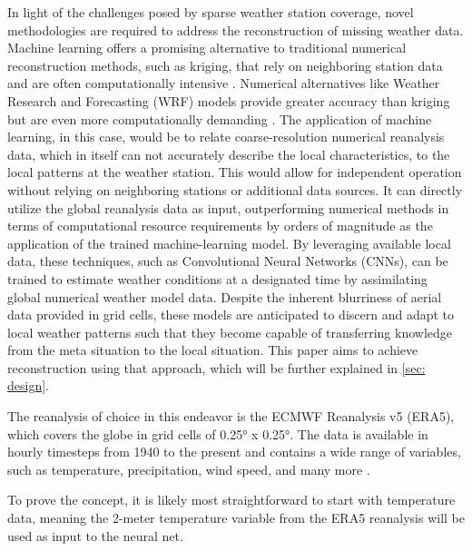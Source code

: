 
In light of the challenges posed by sparse weather station coverage, novel methodologies are required to address the reconstruction of missing weather data.
Machine learning offers a promising alternative to traditional numerical reconstruction methods, such as kriging, that rely on neighboring station data and are often computationally intensive \cite{chung2019kriging}. Numerical alternatives like Weather Research and Forecasting (WRF) models provide greater accuracy than kriging but are even more computationally demanding \cite{skamarock2008wrf}.
The application of machine learning, in this case, would be to relate coarse-resolution numerical reanalysis data, which in itself can not accurately describe the local characteristics, to the local patterns at the weather station.
This would allow for independent operation without relying on neighboring stations or additional data sources. It can directly utilize the global reanalysis data as input, outperforming numerical methods in terms of computational resource requirements by orders of magnitude \cite{kurth2023MLperformance,bi2023MLperformance,lam2023MLperformance} as the application of the trained machine-learning model.
By leveraging available local data, these techniques, such as Convolutional Neural Networks (CNNs), can be trained to estimate weather conditions at a designated time by assimilating global numerical weather model data.
Despite the inherent blurriness of aerial data provided in grid cells, these models are anticipated to discern and adapt to local weather patterns such that they become capable of transferring knowledge from the meta situation to the local situation.
This paper aims to achieve reconstruction using that approach, which will be further explained in \autoref{sec: design}.


The reanalysis of choice in this endeavor is the ECMWF Reanalysis v5 (ERA5), which covers the globe in grid cells of 0.25° x 0.25°.
The data is available in hourly timesteps from 1940 to the present and contains a wide range of variables, such as temperature, precipitation, wind speed, and many more \cite{era5}.

To prove the concept, it is likely most straightforward to start with temperature data, meaning the 2-meter temperature variable from the ERA5 reanalysis will be used as input to the neural net.

